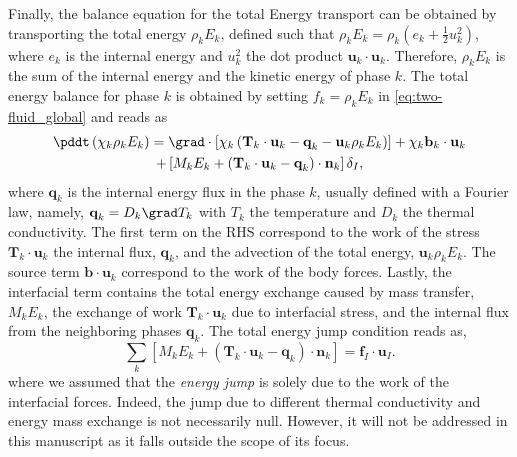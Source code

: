 Finally, the balance equation for the total Energy transport can be obtained by transporting the total energy $\rho_k E_k$, defined such that $\rho_k E_k = \rho_k(e_k + \frac{1}{2}u_k^2)$, 
where $e_k$ is the internal energy and $u_k^2$ the dot product $\textbf{u}_k\cdot\textbf{u}_k$.
Therefore, $\rho_k E_k$ is the sum of the internal energy and the kinetic energy of phase $k$.
The total energy balance for phase $k$ is obtained by setting $f_k = \rho_k E_k$ in \ref{eq:two-fluid_global} and reads as
\begin{multline}
    \pddt \left(
        \chi_k \rho_k E_k
    \right)
    = \grad \cdot \left[
        \chi_k\left(
            \textbf{T}_k\cdot\textbf{u}_k
            - \textbf{q}_k
            - \textbf{u}_k \rho_k E_k 
        \right)
    \right]
    + \chi_k\textbf{b}_k\cdot\textbf{u}_k\\
    +\left[
        M_k E_k
        + \left(
        \textbf{T}_k\cdot\textbf{u}_k
        - \textbf{q}_k
        \right) 
        \cdot\textbf{n}_k   
    \right]\delta_I,
    \label{eq:two-fuild_totenergy}
\end{multline}
where $\textbf{q}_k$ is the internal energy flux in the phase $k$, usually defined with a Fourier 
law, namely, $\textbf{q}_k = D_k\grad T_k$ with $T_k$ the temperature and $D_k$ the thermal 
conductivity. 
The first term on the RHS correspond to the work of the stress $\textbf{T}_k\cdot \textbf{u}_k$ the internal flux, $\textbf{q}_k$,  and the advection of the total energy, $\textbf{u}_k \rho_k E_k$. 
The source term $\textbf{b}\cdot\textbf{u}_k$ correspond to the work of the body forces. 
Lastly, the interfacial term contains the total energy exchange caused by mass transfer, $M_k E_k$, the exchange of work $\textbf{T}_k\cdot\textbf{u}_k$ due to interfacial stress, and the internal flux from the neighboring phases $\textbf{q}_k$.   
The total energy jump condition reads as, 
\begin{equation}
    \sum_k \left[
        M_k E_k
        + \left(
            \textbf{T}_k \cdot \textbf{u}_k
            - \textbf{q}_k 
        \right)
        \cdot \textbf{n}_k
    \right]
    = \textbf{f}_I\cdot\textbf{u}_I.
    \label{eq:total_energy_jump}
\end{equation}
where we assumed that the \textit{energy jump} is solely due to the work of the interfacial forces. 
Indeed, the jump due to different thermal conductivity and energy mass exchange is not necessarily null. 
However, it will not be addressed in this manuscript as it falls outside the scope of its focus. 

